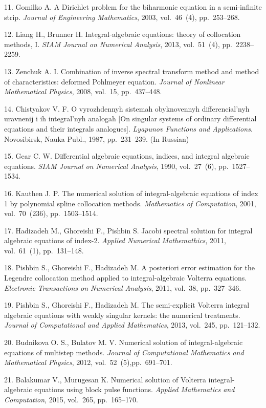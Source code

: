{11. Gomilko A. A Dirichlet problem for the biharmonic equation in
a semi-infinite strip. {\it Journal of Engineering Mathematics},
2003, vol.~46~(4), pp.~253--268.

12. Liang H., Brunner H. Integral-algebraic equations: theory of
collocation methods, I. {\it SIAM Journal on Numerical Analysis},
2013, vol.~51~(4), pp.~2238--2259.

13.  Zenchuk A. I. Combination of inverse spectral transform
method and method of characteristics: deformed Pohlmeyer equation.
{\it Journal of Nonlinear Mathematical Physics}, 2008, vol.~15,
pp.~437--448.

14. Chistyakov V. F. O vyrozhdennyh sistemah obyknovennyh
differencial'nyh uravnenij i ih integral'nyh analogah [On singular
systems of ordinary differential equations and their integrals
analogues]. {\it Lyapunov Functions and Applications}.
Novosibirsk, Nauka Publ., 1987, pp.~231--239. (In Russian)

15. Gear C. W.  Differential algebraic equations, indices, and
integral algebraic equations. {\it SIAM Journal on Numerical
Analysis}, 1990, vol.~27~(6), pp.~1527--1534.

16. Kauthen J. P. The numerical solution of integral-algebraic
equations of index 1 by polynomial spline collocation methods.
{\it Mathematics of Computation}, 2001, vol.~70~(236),
pp.~1503--1514.

17. Hadizadeh M., Ghoreishi F., Pishbin S.  Jacobi spectral
solution for integral algebraic equations of index-2.  {\it
Applied Numerical Mathemathics}, 2011, vol.~61~(1), pp.~131--148.

18. Pishbin S., Ghoreishi F., Hadizadeh M. A posteriori error
estimation for the Legendre collocation method applied to
integral-algebraic Volterra equations. {\it Electronic
Transactions on Numerical Analysis}, 2011, vol.~38, pp.~327--346.

19. Pishbin S., Ghoreishi F.,  Hadizadeh M. The semi-explicit
Volterra integral algebraic equations with weakly singular
kernels: the numerical treatments. {\it Journal of Computational
and Applied Mathematics}, 2013, vol.~245, pp.~121--132.

20. Budnikova O. S., Bulatov M. V.  Numerical solution of
integral-algebraic equations of  multi\-step methods. {\it Journal
of Computational Mathematics and Mathematical  Physics}, 2012,
vol.~52~(5),\linebreak pp.~691--701.

21. Balakumar V., Murugesan K. Numerical solution of Volterra
integral-algebraic equations using block pulse functions. {\it
Applied Mathematics and Computation}, 2015, vol.~265,
pp.~165--170.

}
